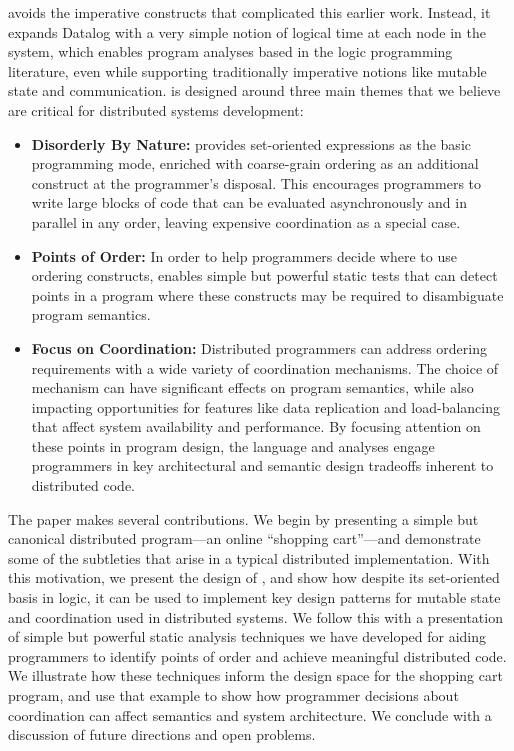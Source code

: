 \lang avoids the imperative constructs that complicated this earlier work.  Instead, it expands Datalog with a very simple notion of logical time at each node in the system, which enables program analyses based in the logic programming literature, even while supporting traditionally imperative notions like mutable state and communication.  \lang is designed around three main themes that we believe are critical for distributed systems development:
\begin{itemize}
    \item {\bf Disorderly By Nature:} \lang provides set-oriented expressions as the basic programming mode, enriched with coarse-grain ordering as an additional construct at the programmer's disposal.  This encourages programmers to write large blocks of code that can be evaluated asynchronously and in parallel in any order, leaving expensive coordination as a special case.
    \item {\bf Points of Order:} In order to help programmers decide where to use ordering constructs, \lang enables simple but powerful static tests that can detect points in a program where these constructs may be required to disambiguate program semantics. %
    \item {\bf Focus on Coordination:} Distributed programmers can address ordering requirements with a wide variety of coordination mechanisms. The choice of mechanism can have significant effects on program semantics, while also impacting opportunities for features like data replication and load-balancing that affect system availability and performance.  By focusing attention on these points in program design, the language and analyses engage programmers in key architectural and semantic design tradeoffs inherent to distributed code.
\end{itemize}

The paper makes several contributions.  We begin by presenting a simple but canonical distributed program---an online ``shopping cart''---and demonstrate some of the subtleties that arise in a typical distributed implementation.  With this motivation, we present the design of \lang, and show how despite its set-oriented basis in logic, it can be used to implement key design patterns for mutable state and coordination used in distributed systems.  We follow this with a presentation of simple but powerful static analysis techniques we have developed for aiding programmers to identify points of order and achieve meaningful 
distributed code.  We illustrate how these techniques inform the design space for the shopping cart program, and use that example to show how programmer decisions about coordination can affect semantics and system architecture.  We conclude with a discussion of future directions and open problems.
